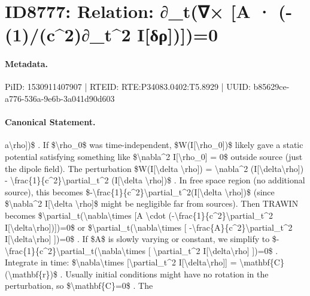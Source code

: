\section*{ID8777: Relation: ∂\_t(∇× [A · (-(1)/(c\textasciicircum{}2)∂\_t\textasciicircum{}2 I[δρ])])=0}
\paragraph{Metadata.}
PiID: 1530911407907 | RTEID: RTE:P34083.0402:T5.8929 | UUID: b85629ce-a776-536a-9e6b-3a041d90d603

\paragraph{Canonical Statement.}
a\textbackslash{}rho])\$ . If \$\textbackslash{}rho\_0\$ was time-independent, \$W(I[\textbackslash{}rho\_0])\$ likely gave a static potential satisfying something like \$\textbackslash{}nabla\textasciicircum{}2 I[\textbackslash{}rho\_0] = 0\$ outside source (just the dipole field). The perturbation \$W(I[\textbackslash{}delta \textbackslash{}rho]) = \textbackslash{}nabla\textasciicircum{}2 (I[\textbackslash{}delta\textbackslash{}rho]) - \textbackslash{}frac\{1\}\{c\textasciicircum{}2\}\textbackslash{}partial\_t\textasciicircum{}2 (I[\textbackslash{}delta \textbackslash{}rho])\$ . In free space region (no additional source), this becomes \$-\textbackslash{}frac\{1\}\{c\textasciicircum{}2\}\textbackslash{}partial\_t\textasciicircum{}2(I[\textbackslash{}delta \textbackslash{}rho])\$ (since \$\textbackslash{}nabla\textasciicircum{}2 I[\textbackslash{}delta \textbackslash{}rho]\$ might be negligible far from sources). Then TRAWIN becomes \$\textbackslash{}partial\_t(\textbackslash{}nabla\textbackslash{}times [A \textbackslash{}cdot (-\textbackslash{}frac\{1\}\{c\textasciicircum{}2\}\textbackslash{}partial\_t\textasciicircum{}2 I[\textbackslash{}delta\textbackslash{}rho])])=0\$ or \$\textbackslash{}partial\_t(\textbackslash{}nabla\textbackslash{}times [ -\textbackslash{}frac\{A\}\{c\textasciicircum{}2\}\textbackslash{}partial\_t\textasciicircum{}2 I[\textbackslash{}delta\textbackslash{}rho] ])=0\$ . If \$A\$ is slowly varying or constant, we simplify to \$-\textbackslash{}frac\{1\}\{c\textasciicircum{}2\}\textbackslash{}partial\_t(\textbackslash{}nabla\textbackslash{}times [ \textbackslash{}partial\_t\textasciicircum{}2 I[\textbackslash{}delta\textbackslash{}rho] ])=0\$ . Integrate in time: \$\textbackslash{}nabla\textbackslash{}times [\textbackslash{}partial\_t\textasciicircum{}2 I[\textbackslash{}delta\textbackslash{}rho]] = \textbackslash{}mathbf\{C\}(\textbackslash{}mathbf\{r\})\$ . Usually initial conditions might have no rotation in the perturbation, so \$\textbackslash{}mathbf\{C\}=0\$ . The

